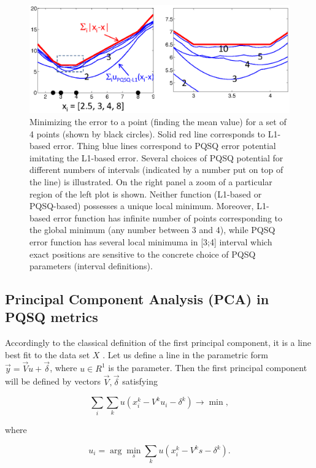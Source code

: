 \documentclass[preprint,12pt,twocolumn]{elsarticle}
\begin{document}
\begin{figure}[h]
\centering\includegraphics[width=1\linewidth]{MeanValue.eps}
\caption{Minimizing the error to a point (finding the mean value) for a set of 4 points (shown by black circles). Solid red line corresponds to L1-based error. Thing blue lines correspond to PQSQ error potential imitating the L1-based error. Several choices of PQSQ potential for different numbers of intervals (indicated by a number put on top of the line) is illustrated. On the right panel a zoom of a particular region of the left plot is shown. Neither function (L1-based or PQSQ-based) possesses a unique local minimum. Moreover, L1-based error function has infinite number of points corresponding to the global minimum (any number between 3 and 4), while PQSQ error function has several local minimuma in [3;4] interval which exact positions are sensitive to the concrete choice of PQSQ parameters (interval definitions).}\label{MeanValueFigure}
\end{figure}


\subsection{Principal Component Analysis (PCA) in PQSQ metrics}

Accordingly to the classical definition of the first principal component, it is a line best fit to the data set $X$ \cite{Pearson1901On}. Let us define a line in the parametric form $\vec{y}=\vec{V}u+\vec{\delta}$, where $u \in R^1$ is the parameter. Then the first principal component will be defined by vectors $\vec{V}, \vec{\delta}$ satisfying

\begin{equation}
\sum_i\sum_k u(x_i^k-V^ku_i-\delta^k) \rightarrow \min,
\end{equation}

\noindent where

\begin{equation}
u_i = \arg \min_s \sum_k u(x_i^k-V^ks-\delta^k).
\end{equation}
\end{document}

